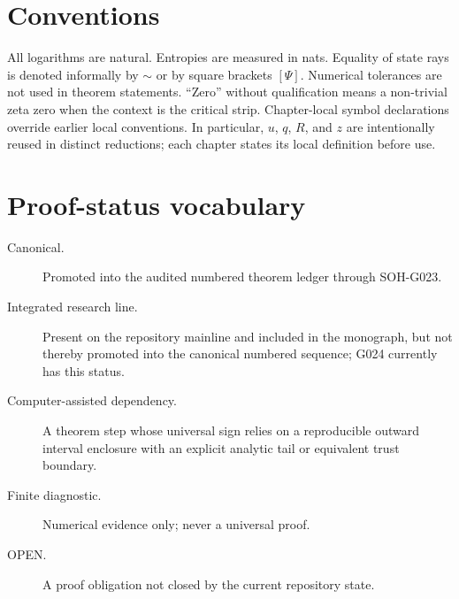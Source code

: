 \section{Conventions}
All logarithms are natural. Entropies are measured in nats. Equality of state rays is denoted informally by $\sim$ or by square brackets $[\Psi]$. Numerical tolerances are not used in theorem statements. ``Zero'' without qualification means a non-trivial zeta zero when the context is the critical strip. Chapter-local symbol declarations override earlier local conventions. In particular, $u$, $q$, $R$, and $z$ are intentionally reused in distinct reductions; each chapter states its local definition before use.

\section{Proof-status vocabulary}
\begin{description}
\item[Canonical.] Promoted into the audited numbered theorem ledger through SOH-G023.
\item[Integrated research line.] Present on the repository mainline and included in the monograph, but not thereby promoted into the canonical numbered sequence; G024 currently has this status.
\item[Computer-assisted dependency.] A theorem step whose universal sign relies on a reproducible outward interval enclosure with an explicit analytic tail or equivalent trust boundary.
\item[Finite diagnostic.] Numerical evidence only; never a universal proof.
\item[OPEN.] A proof obligation not closed by the current repository state.
\end{description}
